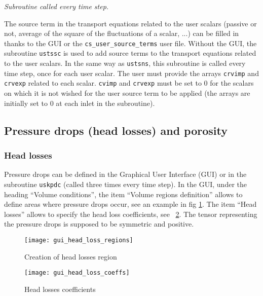 {{{\noindent
\textit{Subroutine called every time step.}

The source term in the transport equations related to the user scalars
(passive or not, average of the square of the fluctuations of a scalar, ...)
can be filled in thanks to the GUI or the \texttt{cs\_user\_source\_terms} user file.
Without the GUI, the subroutine \texttt{ustssc} is used to add source terms to the
transport equations related to the user scalars. In the same way as
\texttt{ustsns}, this subroutine is called every time step, once for
each user scalar. The user must provide the arrays \texttt{crvimp}
and \texttt{crvexp} related to each scalar. \texttt{cvimp} and \texttt{crvexp}
must be set to 0 for the scalars on which it is not wished for the user source
term to be applied (the arrays are initially set to 0 at each inlet in the subroutine).

\subsection{Pressure drops (head losses) and porosity}
\label{sec:prg_headlosses}

\subsubsection{Head losses}

Pressure drops can be defined in the Graphical User Interface (GUI) or in the subroutine \texttt{uskpdc} (called three times every time step). In the GUI, under the heading ``Volume conditions'', the item ``Volume regions definition'' allows to define areas where pressure drops occur, see an example in fig \ref{fig:hl1}. The item ``Head losses'' allows to specify the head loss coefficients, see \figurename~\ref{fig:hl2}. The tensor representing the pressure drops is supposed to be symmetric
and positive.

\begin{figure}[!ht]
\begin{center}
\texttt{[image: gui\_head\_loss\_regions]}
\caption{Creation of head losses region}
\label{fig:hl1}
\end{center}
\end{figure}
%
\begin{figure}[!ht]
\begin{center}
\texttt{[image: gui\_head\_loss\_coeffs]}
\caption{Head losses coefficients}
\label{fig:hl2}
\end{center}
\end{figure}

}}}
